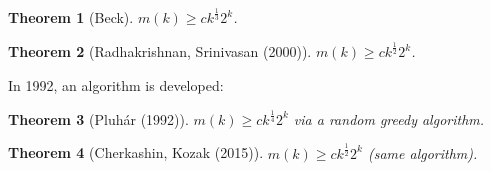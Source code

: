 \documentclass[a4paper,11pt]{amsbook}
\newtheorem{theorem}{\hspace{-2em} \color{darkblue} Theorem}[chapter]
\theoremstyle{definition}
\theoremstyle{remark}
\newcommand\0{\varnothing}
\begin{document}
\begin{theorem}[Beck]
    $m(k)\geq ck^{\frac{1}{3}}2^k$.
\end{theorem}
\begin{theorem}[Radhakrishnan, Srinivasan (2000)]
    $m(k)\geq ck^{\frac{1}{2}}2^k$.
\end{theorem}

In 1992, an algorithm is developed:
\begin{theorem}[Pluhár (1992)]
    $m(k)\geq ck^{\frac{1}{4}}2^k$ via a random greedy algorithm.
\end{theorem}
\begin{theorem}[Cherkashin, Kozak (2015)]
    $m(k)\geq ck^{\frac{1}{2}}2^k$ (same algorithm).
\end{theorem}

\end{document}
